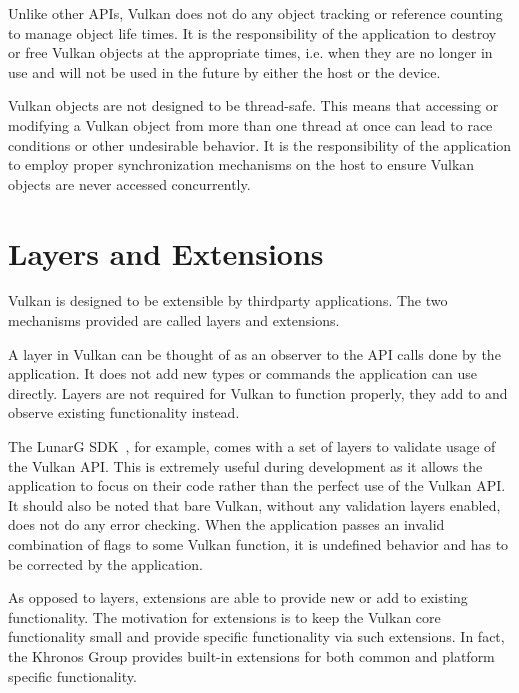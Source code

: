     Unlike other APIs, Vulkan does not do any object tracking or reference counting to manage object life times.
    It is the responsibility of the \gls{application} to destroy or free Vulkan objects at the appropriate times, i.e.
    when they are no longer in use and will not be used in the future by either the \gls{host} or the device.

    Vulkan objects are not designed to be thread-safe.
    This means that accessing or modifying a Vulkan object from more than one thread at once can lead to race conditions or other undesirable behavior.
    It is the responsibility of the \gls{application} to employ proper synchronization mechanisms on the \gls{host} to ensure Vulkan objects are never accessed concurrently.

  \section{Layers and Extensions}
  \label{sec:LayersAndExtensions}
    Vulkan is designed to be extensible by thirdparty \glspl{application}. The two mechanisms provided are called layers and extensions.

    A layer in Vulkan can be thought of as an observer to the API calls done by the \gls{application}.
    It does not add new types or commands the \gls{application} can use directly.
    Layers are not required for Vulkan to function properly, they add to and observe existing functionality instead.

    The LunarG SDK~\cite{lunargvulkansdk}, for example, comes with a set of layers to validate usage of the Vulkan API. This is extremely useful during development as it allows the \gls{application} to focus on their code rather than the perfect use of the Vulkan API. It should also be noted that bare Vulkan, without any validation layers enabled, does not do any error checking. When the \gls{application} passes an invalid combination of flags to some Vulkan function, it is undefined behavior and has to be corrected by the \gls{application}.

    As opposed to layers, extensions are able to provide new or add to existing functionality. The motivation for extensions is to keep the Vulkan core functionality small and provide specific functionality via such extensions. In fact, the Khronos Group provides built-in extensions for both common and platform specific functionality.

